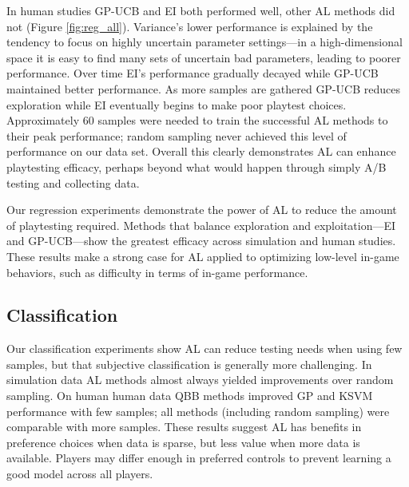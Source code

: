\documentclass{sig-alternate}
\begin{document}
In human studies GP-UCB and EI both performed well, other AL methods did not (Figure \ref{fig:reg_all}).
Variance's lower performance is explained by the tendency to focus on highly uncertain parameter settings---in a high-dimensional space it is easy to find many sets of uncertain bad parameters, leading to poorer performance.
Over time EI's performance gradually decayed while GP-UCB maintained better performance.
As more samples are gathered GP-UCB reduces exploration while EI eventually begins to make poor playtest choices.
Approximately 60 samples were needed to train the successful AL methods to their peak performance; random sampling never achieved this level of performance on our data set.
Overall this clearly demonstrates AL can enhance playtesting efficacy, perhaps beyond what would happen through simply A/B testing and collecting data.

Our regression experiments demonstrate the power of AL to reduce the amount of playtesting required.
Methods that balance exploration and exploitation---EI and GP-UCB---show the greatest efficacy across simulation and human studies.
These results make a strong case for AL applied to optimizing low-level in-game behaviors, such as difficulty in terms of in-game performance.


\subsection{Classification}
Our classification experiments show AL can reduce testing needs when using few samples, but that subjective classification is generally more challenging.
In simulation data AL methods almost always yielded improvements over random sampling.
On human human data QBB methods improved GP and KSVM performance with few samples; all methods (including random sampling) were comparable with more samples.
These results suggest AL has benefits in preference choices when data is sparse, but less value when more data is available.
Players may differ enough in preferred controls to prevent learning a good model across all players.
\end{document}
